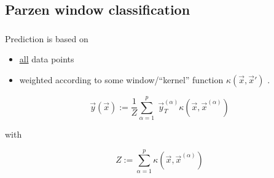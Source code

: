 

\subsection{Parzen window classification}


\begin{frame}\frametitle{\subsecname}

Prediction is based on 
\begin{itemize}
\item \underline{all} data points 
\item {} weighted according to some window/``kernel'' function $\kappa(\vec x, \vec x')$ .
\end{itemize}

\begin{equation}
\vec y(\vec x) := \frac{1}{Z} \sum_{\alpha=1}^{p}\;\vec y_T^{(\alpha)} \kappa(\vec x, \vec x^{(\alpha)})
\end{equation}

with

\begin{equation}
Z := \sum_{\alpha=1}^{p} \kappa(\vec x, \vec x^{(\alpha)})
\end{equation}

\end{frame}

